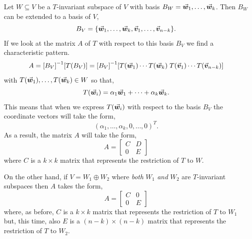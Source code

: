 \documentclass[MathsNotesBase.tex]{subfiles}
\begin{document}
{		\medskip
		Let ${ W \subseteq V }$ be a $T$-invariant subspace of $V$ with basis ${ B_W = \vec{\bm{w}}_1,\dots,\vec{\bm{w}}_k }$. Then $B_W$ can be extended to a basis of $V$,
		\[ B_V = \{ \vec{\bm{w}}_1,\dots,\vec{\bm{w}}_k, \vec{\bm{v}}_1,\dots,\vec{\bm{v}}_{n-k} \}. \]
		If we look at the matrix $A$ of $T$ with respect to this basis $B_V$ we find a characteristic pattern.
		\[ A = {[B_V]}^{-1}[T(B_V)] = {[B_V]}^{-1}[T(\vec{\bm{w}}_1) \cdots T(\vec{\bm{w}}_k) \; T(\vec{\bm{v}}_1) \cdots T(\vec{\bm{v}}_{n-k})] \]
		with ${ T(\vec{\bm{w}}_1), \dots, T(\vec{\bm{w}}_k) \in W }$ so that,
		\[ T(\vec{\bm{w}}_i) = \alpha_1\vec{\bm{w}}_1 + \cdots + \alpha_k\vec{\bm{w}}_k. \] 
		This means that when we express $T(\vec{\bm{w}}_i)$ with respect to the basis $B_V$ the coordinate vectors will take the form,
		\[ (\alpha_1,\dots,\alpha_k,0,\dots,0)^T. \]
		As a result, the matrix $A$ will take the form,
		\[ A = \begin{bmatrix}
				C & D\\
				0 & E
				\end{bmatrix}\label{eq:invariant_space_block_decomposition}
		\]
		where $C$ is a ${ k \times k }$ matrix that represents the restriction of $T$ to $W$.\\
		
		
		On the other hand, if ${ V = W_1 \oplus W_2 }$ where \textit{both} $W_1$ \textit{and} $W_2$ are $T$-invariant subspaces then $A$ takes the form,
		\[ A = \begin{bmatrix}
				C & 0\\
				0 & E
				\end{bmatrix} 
		\]
		where, as before, $C$ is a ${ k \times k }$ matrix that represents the restriction of $T$ to $W_1$ but, this time, also $E$ is a ${ (n-k) \times (n-k) }$ matrix that represents the restriction of $T$ to $W_2$.
		
		\smallskip{}
		
		\bigskip
}
\end{document}
